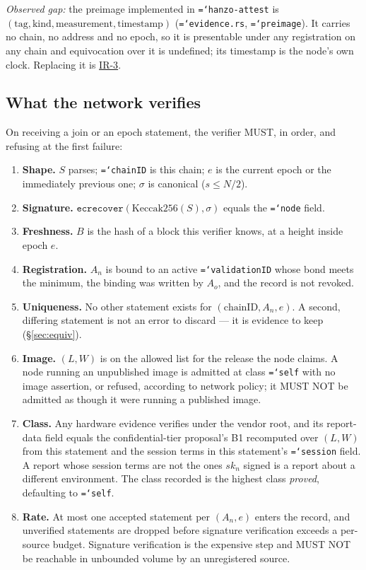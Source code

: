 \documentclass[11pt,a4paper]{article}
\newcommand{\code}[1]{\texttt{\hyphenchar\font=`\-\relax #1}}
\newcommand{\kec}{\mathrm{Keccak256}}
\begin{document}
\emph{Observed gap:} the preimage implemented in \code{hanzo-attest} is
$(\text{tag}, \text{kind}, \text{measurement}, \text{timestamp})$
(\code{evidence.rs}, \code{preimage}). It carries no chain, no address and no
epoch, so it is presentable under any registration on any chain and equivocation
over it is undefined; its timestamp is the node's own clock. Replacing it is
\hyperref[sec:req]{IR-3}.

\subsection{What the network verifies}

On receiving a join or an epoch statement, the verifier MUST, in order, and
refusing at the first failure:

\begin{enumerate}[label=\textbf{V\arabic*.},leftmargin=2.6em]
\item \textbf{Shape.} $S$ parses; \code{chainID} is this chain; $e$ is the current
  epoch or the immediately previous one; $\sigma$ is canonical ($s \le N/2$).
\item \textbf{Signature.} $\mathtt{ecrecover}(\kec(S), \sigma)$ equals the
  \code{node} field.
\item \textbf{Freshness.} $B$ is the hash of a block this verifier knows, at a
  height inside epoch $e$.
\item \textbf{Registration.} $A_n$ is bound to an active \code{validationID} whose
  bond meets the minimum, the binding was written by $A_o$, and the record is not
  revoked.
\item \textbf{Uniqueness.} No other statement exists for $(\text{chainID}, A_n, e)$.
  A second, differing statement is not an error to discard --- it is evidence to
  keep (\S\ref{sec:equiv}).
\item \textbf{Image.} $(L, W)$ is on the allowed list for the release the node
  claims. A node running an unpublished image is admitted at class \code{self}
  with no image assertion, or refused, according to network policy; it MUST NOT be
  admitted as though it were running a published image.
\item \textbf{Class.} Any hardware evidence verifies under the vendor root, and its
  report-data field equals the confidential-tier proposal's B1 recomputed over
  $(L, W)$ from this statement and the session terms in this statement's
  \code{session} field. A report whose session terms are not the ones $sk_n$
  signed is a report about a different environment. The class recorded is the
  highest class \emph{proved}, defaulting to \code{self}.
\item \textbf{Rate.} At most one accepted statement per $(A_n, e)$ enters the
  record, and unverified statements are dropped before signature verification
  exceeds a per-source budget. Signature verification is the expensive step and
  MUST NOT be reachable in unbounded volume by an unregistered source.
\end{enumerate}
\end{document}

